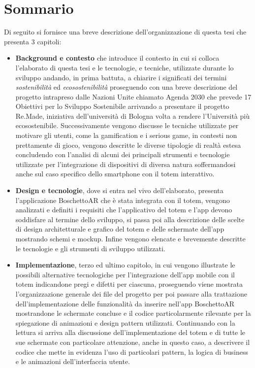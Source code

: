 \section*{Sommario}
Di seguito si fornisce una breve descrizione dell'organizzazione di questa tesi che presenta 3 capitoli: 
\begin{itemize}
    \item \textbf{Background e contesto} che introduce il contesto in cui si colloca l'elaborato di questa tesi e le tecnologie, e tecniche, utilizzate durante lo sviluppo andando, in prima battuta, a chiarire i significati dei termini \textit{sostenibilità} ed \textit{ecosostenibilità} proseguendo con una breve descrizione del progetto intrapreso dalle Nazioni Unite chiamato Agenda 2030 che prevede 17 Obiettivi per lo Sviluppo Sostenibile arrivando a presentare il progetto Re.Made, iniziativa dell'università di Bologna volta a rendere l'Università più ecosostenibile.
    Successivamente vengono discusse le tecniche utilizzate per motivare gli utenti, come la gamification e i serious game, in contesti non prettamente di gioco, vengono descritte le diverse tipologie di realtà estesa concludendo con l'analisi di alcuni dei principali strumenti e tecnologie utilizzate per l'integrazione di dispositivi di diversa natura soffermandosi anche sul caso specifico dello smartphone con il totem interattivo.
    \item \textbf{Design e tecnologie}, dove si entra nel vivo dell'elaborato, presenta l'applicazione BoschettoAR che è stata integrata con il totem, vengono analizzati e definiti i requisiti che l'applicativo del totem e l'app devono soddisfare al termine dello sviluppo, si passa poi alla descrizione delle scelte di design architetturale e grafico del totem e delle schermate dell'app mostrando schemi e mockup. Infine vengono elencate e brevemente descritte le tecnologie e gli strumenti di sviluppo utilizzati.
    \item \textbf{Implementazione}, terzo ed ultimo capitolo, in cui vengono illustrate le possibili alternative tecnologiche per l'integrazione dell'app mobile con il totem indicandone pregi e difetti per ciascuna, proseguendo viene mostrata l'organizzazione generale dei file del progetto per poi passare alla trattazione dell'implementazione delle funzionalità da inserire nell'app BoschettoAR mostrandone le schermate concluse e il codice particolarmente rilevante per la spiegazione di animazioni e design pattern utilizzati. Continuando con la lettura si arriva alla discussione dell'implementazione del totem e di tutte le sue schermate con particolare attenzione, anche in questo caso, a descrivere il codice che mette in evidenza l'uso di particolari pattern, la logica di business e le animazioni dell'interfaccia utente.
\end{itemize}